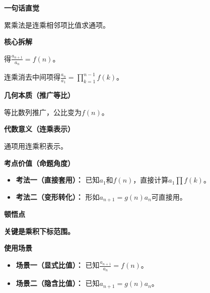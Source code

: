 \begin{explanationbox}
	\textbf{\textcolor{CExplanation}{一句话直觉}}

	累乘法是连乘相邻项比值求通项。

	\medskip
	\textbf{\textcolor{CExplanation}{核心拆解}}
	\begin{description}[style=nextline, leftmargin=2.8em, labelsep=0.5em, itemsep=0.45em]
		\item[\textbf{要点一（递推比值）：}] 得$\frac{a_{n+1}}{a_n}=f(n)$。
		\item[\textbf{要点二（累乘消元）：}] 连乘消去中间项得$\frac{a_n}{a_1}=\prod_{k=1}^{n-1}f(k)$。
	\end{description}

	\medskip
	\textbf{\textcolor{CExplanation}{几何本质（推广等比）}}

	等比数列推广，公比变为$f(n)$。

	\medskip
	\textbf{\textcolor{CExplanation}{代数意义（连乘表示）}}

	通项用连乘积表示。

	\medskip
	\textbf{\textcolor{CExplanation}{考点价值（命题角度）}}
	\begin{itemize}[leftmargin=*, itemsep=0.5em, topsep=0.4em]
		\item \textbf{考法一（直接套用）：} 已知$a_1$和$f(n)$，直接计算$a_1\prod f(k)$。
		\item \textbf{考法二（变形转化）：} 形如$a_{n+1}=g(n)a_n$可直接用。
	\end{itemize}

	\medskip
	\textbf{\textcolor{CExplanation}{顿悟点}}

	\textbf{关键是乘积下标范围。}

	\medskip
	\textbf{\textcolor{CExplanation}{使用场景}}
	\begin{itemize}[leftmargin=*, itemsep=0.5em, topsep=0.4em]
		\item \textbf{场景一（显式比值）：} 已知$\frac{a_{n+1}}{a_n}=f(n)$。
		\item \textbf{场景二（隐含比值）：} 已知$a_{n+1}=g(n)a_n$。
	\end{itemize}
\end{explanationbox}
